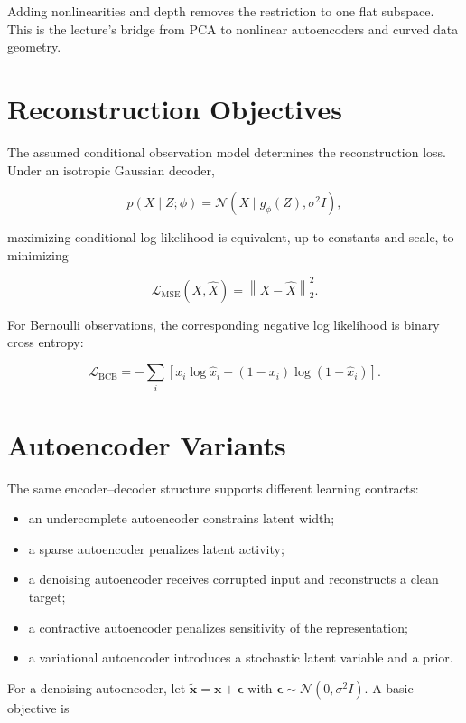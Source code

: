 \documentclass{article}
\begin{document}
Adding nonlinearities and depth removes the restriction to one flat subspace. This is
the lecture's bridge from PCA to nonlinear autoencoders and curved data geometry.


\section{Reconstruction Objectives}

The assumed conditional observation model determines the reconstruction loss. Under
an isotropic Gaussian decoder,

\[
p(X\mid Z;\phi)=\mathcal{N}\!\left(
X\mid g_{\phi}(Z),\sigma^2I
\right),
\]

maximizing conditional log likelihood is equivalent, up to constants and scale, to
minimizing

\[
\mathcal{L}_{\mathrm{MSE}}(X,\hat X)=\left\|X-\hat X\right\|_2^2.
\]

For Bernoulli observations, the corresponding negative log likelihood is binary cross
entropy:

\[
\mathcal{L}_{\mathrm{BCE}}
=-\sum_i\left[x_i\log \hat x_i+(1-x_i)\log(1-\hat x_i)\right].
\]


\section{Autoencoder Variants}

The same encoder--decoder structure supports different learning contracts:

\begin{itemize}
\item an undercomplete autoencoder constrains latent width;
\item a sparse autoencoder penalizes latent activity;
\item a denoising autoencoder receives corrupted input and reconstructs a clean target;
\item a contractive autoencoder penalizes sensitivity of the representation;
\item a variational autoencoder introduces a stochastic latent variable and a prior.
\end{itemize}

For a denoising autoencoder, let
$\tilde{\mathbf{x}}=\mathbf{x}+\boldsymbol{\epsilon}$ with
$\boldsymbol{\epsilon}\sim\mathcal{N}(0,\sigma^2I)$. A basic objective is
\end{document}
